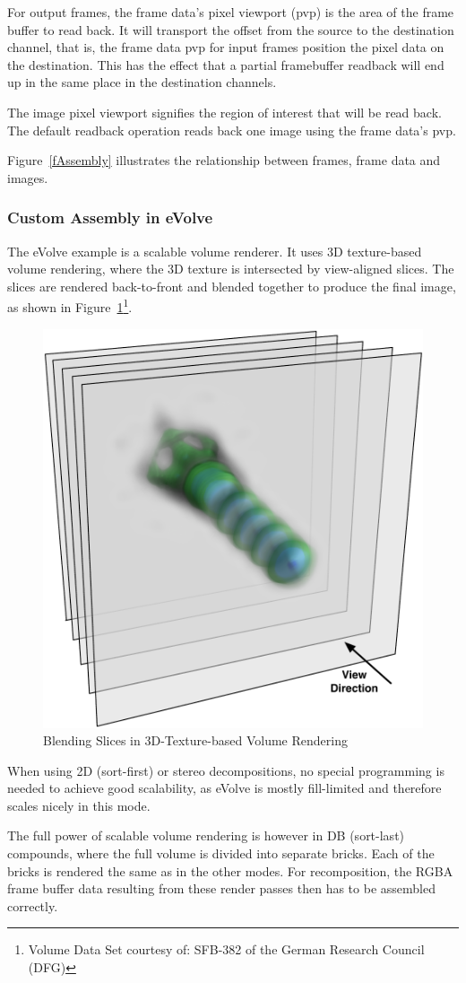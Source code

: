 \documentclass[10pt,a4]{scrartcl}
\newcommand{\fig}[1]{Figure~\ref{#1}}
\begin{document}
For output frames, the frame data's pixel viewport (pvp) is the area of
the frame buffer to read back. It will transport the offset from the
source to the destination channel, that is, the frame data pvp for input
frames position the pixel data on the destination. This has the effect
that a partial framebuffer readback will end up in the same place in the
destination channels.

The image pixel viewport signifies the region of interest that will be read
back. The default readback operation reads back one image using the
frame data's pvp.

\fig{fAssembly} illustrates the relationship between frames, frame data
and images.

\subsubsection{Custom Assembly in eVolve}

The \textsf{eVolve} example is a scalable volume renderer. It uses 3D
texture-based volume rendering, where the 3D texture is intersected by
view-aligned slices. The slices are rendered back-to-front and blended
together to produce the final image, as shown in
\fig{fSlices}\footnote{Volume Data Set courtesy of: SFB-382 of the German
  Research Council (DFG)}.

\begin{figure}
  \includegraphics[width=.4\textwidth]{images/slices.pdf}
  {\caption{\small\label{fSlices}Blending Slices in 3D-Texture-based
      Volume Rendering}}\vspace{-3ex}
\end{figure}
When using 2D (sort-first) or stereo decompositions, no special
programming is needed to achieve good scalability, as \textsf{eVolve} is
mostly fill-limited and therefore scales nicely in this mode. 

The full power of scalable volume rendering is however in DB (sort-last)
compounds, where the full volume is divided into separate bricks. Each
of the bricks is rendered the same as in the other modes. For
recomposition, the \textsf{RGBA} frame buffer data resulting from these
render passes then has to be assembled correctly.
\end{document}
